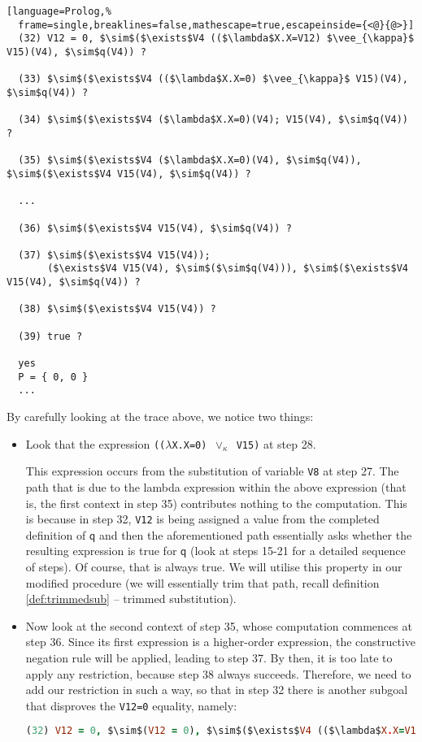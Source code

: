 \documentclass[inscr,ack,preface]{dithesis}
\theoremstyle{definition}
\newcommand{\msf}[1]{$\mathsf{#1}$}
\begin{document}
\begin{lstlisting}[language=Prolog,%
  frame=single,breaklines=false,mathescape=true,escapeinside={<@}{@>}]
  (32) V12 = 0, $\sim$($\exists$V4 (($\lambda$X.X=V12) $\vee_{\kappa}$ V15)(V4), $\sim$q(V4)) ?

  (33) $\sim$($\exists$V4 (($\lambda$X.X=0) $\vee_{\kappa}$ V15)(V4), $\sim$q(V4)) ?

  (34) $\sim$($\exists$V4 ($\lambda$X.X=0)(V4); V15(V4), $\sim$q(V4)) ?

  (35) $\sim$($\exists$V4 ($\lambda$X.X=0)(V4), $\sim$q(V4)), $\sim$($\exists$V4 V15(V4), $\sim$q(V4)) ?

  ...

  (36) $\sim$($\exists$V4 V15(V4), $\sim$q(V4)) ?

  (37) $\sim$($\exists$V4 V15(V4));
       ($\exists$V4 V15(V4), $\sim$($\sim$q(V4))), $\sim$($\exists$V4 V15(V4), $\sim$q(V4)) ?

  (38) $\sim$($\exists$V4 V15(V4)) ?

  (39) true ?

  yes
  P = { 0, 0 }
  ...
\end{lstlisting}

By carefully looking at the trace above, we notice two things:
\begin{itemize}
  \item Look that the expression \texttt{(($\lambda$X.X=0) $\vee_{\kappa}$ V15)} at step 28.

  This expression occurs from the substitution of variable \texttt{V8} at step 27. The path that is due to the lambda expression within the above expression (that is, the first context in step 35) contributes nothing to the computation. This is because in step 32, \texttt{V12} is being assigned a value from the completed definition of \msf{q} and then the aforementioned path essentially asks whether the resulting expression is true for \msf{q} (look at steps 15-21 for a detailed sequence of steps). Of course, that is always true. We will utilise this property in our modified procedure (we will essentially trim that path, recall definition \ref{def:trimmedsub} -- trimmed substitution).
  \item Now look at the second context of step 35, whose computation commences at step 36. Since its first expression is a higher-order expression, the constructive negation rule will be applied, leading to step 37. By then, it is too late to apply any restriction, because step 38 always succeeds. Therefore, we need to add our restriction in such a way, so that in step 32 there is another subgoal that disproves the \texttt{V12=0} equality, namely:
  \begin{lstlisting}[language=Prolog,%
    frame=single,breaklines=false,mathescape=true]
  (32) V12 = 0, $\sim$(V12 = 0), $\sim$($\exists$V4 (($\lambda$X.X=V12) $\vee_{\kappa}$ V15)(V4), $\sim$q(V4)) ?
  \end{lstlisting}
\end{itemize}
\end{document}
